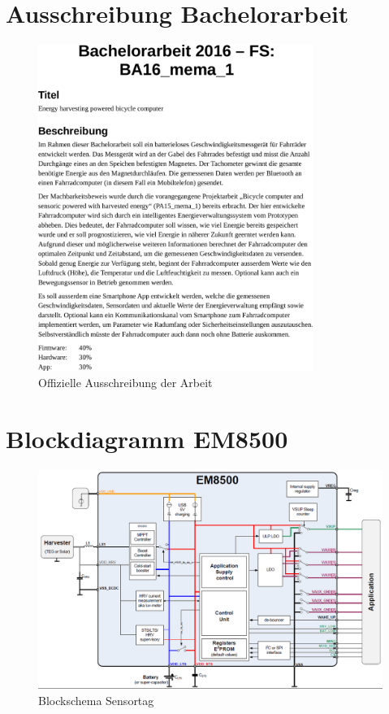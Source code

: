 
\appendix


\chapter{Ausschreibung Bachelorarbeit}
\label{Ausschreibung} 

\begin{figure}[h]
    \includegraphics [width=0.8\textwidth] {7Anhang/docs/Ausschreibung-cropped.pdf} 
     \caption{Offizielle Ausschreibung der Arbeit}
\end{figure}



\chapter{Blockdiagramm EM8500}
\label{anhang_em8500} 

\begin{figure}[h]
    \includegraphics [width=1\textwidth]{7Anhang/imag/blockdiagrammEm8500.png} 
     \caption{Blockschema Sensortag}
\end{figure}



